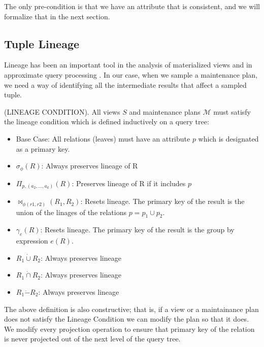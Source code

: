 The only pre-condition is that we have an attribute that is consistent, and we will formalize that in the next section.

\subsection{Tuple Lineage}
Lineage has been an important tool in the analysis of materialized views \cite{DBLP:journals/vldb/CuiW03} and in approximate query processing \cite{DBLP:conf/sigmod/ZengGMZ14}.
In our case, when we sample a maintenance plan, we need a way of identifying all the intermediate results that affect a sampled tuple.

\begin{definition}
(LINEAGE CONDITION). All views $S$ and maintenance plans $\mathcal{M}$ must satisfy the lineage condition which is defined inductively on a query tree:
\begin{itemize}\vspace{-.45em}
\item Base Case: All relations (leaves) must have an attribute $p$ which is designated as a primary key.\vspace{-.45em}
\item $\sigma_{\phi}(R)$: Always preserves lineage of R \vspace{-.45em}
\item $\Pi_{p,(a_2,...,a_k)}(R)$: Preserves lineage of R if it includes $p$  \vspace{-.45em}
\item $\bowtie_{\phi (r1,r2)}(R_1,R_2)$: Resets lineage. The primary key of the result is the union of the linages of the relations $p= p_1 \cup p_2$. 
\item $\gamma_{e}(R)$: Resets lineage. The primary key of the result is the group by expression $e(R)$.\vspace{-.45em}
\item $R_1 \dot{\cup} R_2$: Always preserves lineage
\item $R_1 \dot{\cap} R_2$: Always preserves lineage 
\item $R_1 \dot{-} R_2$: Always preserves lineage 
\end{itemize}
\end{definition}

The above definition is also constructive; that is, if a view or a maintainance plan does not satisfy the Lineage Condition we can modify the plan so that it does.
We modify every projection operation to ensure that primary key of the relation is never projected out of the next level of the query tree.

